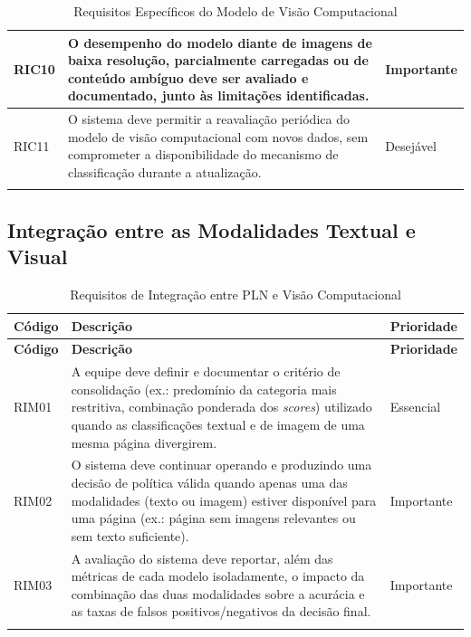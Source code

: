 \documentclass[
    12pt,           %
    oneside,        %
    a4paper,        %
    chapter=TITLE,  %
    english,        %
    brazil          %
]{abntex2}
\begin{document}
\begin{longtable}{|p{1.7cm}|p{9.8cm}|p{2.1cm}|}
RIC10 & O desempenho do modelo diante de imagens de baixa resolução, parcialmente carregadas ou de conteúdo ambíguo deve ser avaliado e documentado, junto às limitações identificadas. & Importante \\ \hline
RIC11 & O sistema deve permitir a reavaliação periódica do modelo de visão computacional com novos dados, sem comprometer a disponibilidade do mecanismo de classificação durante a atualização. & Desejável \\ \hline

\caption{Requisitos Específicos do Modelo de Visão Computacional}
\label{tab:requisitos-ic}
\end{longtable}

\subsection{Integração entre as Modalidades Textual e Visual}

\begin{longtable}{|p{1.7cm}|p{9.8cm}|p{2.1cm}|}
\hline
\textbf{Código} & \textbf{Descrição} & \textbf{Prioridade} \\ \hline
\endfirsthead
\hline
\textbf{Código} & \textbf{Descrição} & \textbf{Prioridade} \\ \hline
\endhead

RIM01 & A equipe deve definir e documentar o critério de consolidação (ex.: predomínio da categoria mais restritiva, combinação ponderada dos \textit{scores}) utilizado quando as classificações textual e de imagem de uma mesma página divergirem. & Essencial \\ \hline
RIM02 & O sistema deve continuar operando e produzindo uma decisão de política válida quando apenas uma das modalidades (texto ou imagem) estiver disponível para uma página (ex.: página sem imagens relevantes ou sem texto suficiente). & Importante \\ \hline
RIM03 & A avaliação do sistema deve reportar, além das métricas de cada modelo isoladamente, o impacto da combinação das duas modalidades sobre a acurácia e as taxas de falsos positivos/negativos da decisão final. & Importante \\ \hline

\caption{Requisitos de Integração entre PLN e Visão Computacional}
\label{tab:requisitos-integracao}
\end{longtable}

\end{document}
